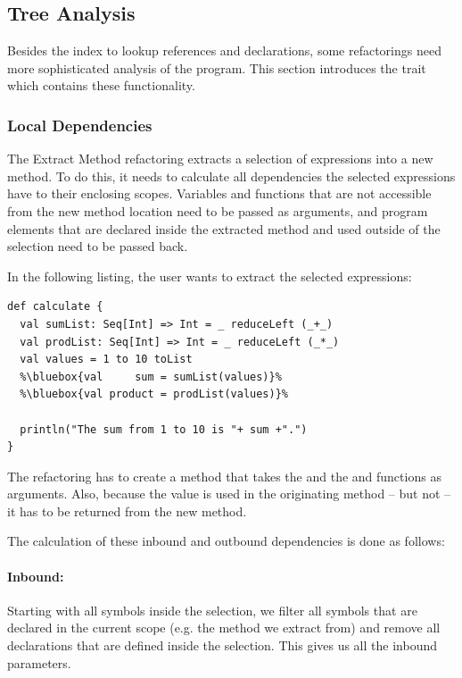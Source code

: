 \subsection{Tree Analysis}

Besides the index to lookup references and declarations, some refactorings need more sophisticated analysis of the program. This section introduces the  trait which contains these functionality.

\subsubsection{Local Dependencies}

The Extract Method refactoring extracts a selection of expressions into a new method. To do this, it needs to calculate all dependencies the selected expressions have to their enclosing scopes. Variables and functions that are not accessible from the new method location need to be passed as arguments, and program elements that are declared inside the extracted method and used outside of the selection need to be passed back.

In the following listing, the user wants to extract the selected expressions:

\begin{lstlisting}
def calculate {
  val sumList: Seq[Int] => Int = _ reduceLeft (_+_)
  val prodList: Seq[Int] => Int = _ reduceLeft (_*_)
  val values = 1 to 10 toList
  %\bluebox{val     sum = sumList(values)}%
  %\bluebox{val product = prodList(values)}%

  println("The sum from 1 to 10 is "+ sum +".")
}
\end{lstlisting}

The refactoring has to create a method that takes the  and the  and  functions as arguments. Also, because the  value is used in the originating method -- but not  -- it has to be returned from the new method.

The calculation of these inbound and outbound dependencies is done as follows:

\paragraph{Inbound:} Starting with all symbols inside the selection, we filter all symbols that are declared in the current scope (e.g. the method we extract from) and remove all declarations that are defined inside the selection. This gives us all the inbound parameters.

